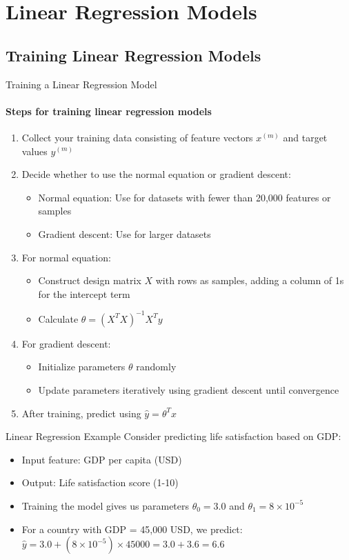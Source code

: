 \section{Linear Regression Models}

\subsection{Training Linear Regression Models}

\begin{KR}{Training a Linear Regression Model}
\paragraph{Steps for training linear regression models}
\begin{enumerate}
    \item Collect your training data consisting of feature vectors $x^{(m)}$ and target values $y^{(m)}$
    \item Decide whether to use the normal equation or gradient descent:
    \begin{itemize}
        \item Normal equation: Use for datasets with fewer than 20,000 features or samples
        \item Gradient descent: Use for larger datasets
    \end{itemize}
    \item For normal equation:
    \begin{itemize}
        \item Construct design matrix $X$ with rows as samples, adding a column of 1s for the intercept term
        \item Calculate $\theta = (X^T X)^{-1}X^T y$
    \end{itemize}
    \item For gradient descent:
    \begin{itemize}
        \item Initialize parameters $\theta$ randomly
        \item Update parameters iteratively using gradient descent until convergence
    \end{itemize}
    \item After training, predict using $\hat{y} = \theta^T x$
\end{enumerate}
\end{KR}

\begin{example2}{Linear Regression Example}
Consider predicting life satisfaction based on GDP:
\begin{itemize}
    \item Input feature: GDP per capita (USD)
    \item Output: Life satisfaction score (1-10)
    \item Training the model gives us parameters $\theta_0 = 3.0$ and $\theta_1 = 8 \times 10^{-5}$
    \item For a country with GDP = 45,000 USD, we predict:
    $\hat{y} = 3.0 + (8 \times 10^{-5}) \times 45000 = 3.0 + 3.6 = 6.6$
\end{itemize}
\end{example2}

